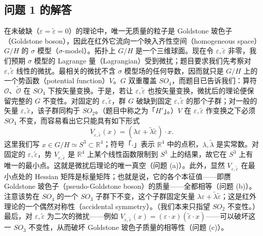 

\subsection*{问题 1 的解答}

在未破缺（$\varepsilon=\tilde\varepsilon=0$）的理论中，唯一无质量的粒子是 Goldstone 玻色子（Goldstone boson），因此在红外它流向一个映入齐性空间（homogeneous space）$G/H$ 的 $\sigma$ 模型（$\sigma$-model）。拓扑上 $G/H$ 是一个三维球面。现在令 $\varepsilon,\tilde\varepsilon$ 非零，我们预期 $\sigma$ 模型的 Lagrange 量（Lagrangian）受到微扰；题目要求我们先考察对 $\varepsilon,\tilde\varepsilon$ 线性的微扰。最相关的微扰不含 $\sigma$ 模型场的任何导数，因而就只是 $G/H$ 上的一个势函数（potential function）$V$。$G$ 双重覆盖 $SO_4$，而题目已告诉我们：算符 $\mathcal{O}$、$\tilde{\mathcal{O}}$ 在 $SO_4$ 下按矢量变换。于是，若让 $\varepsilon,\tilde\varepsilon$ 也按矢量变换，微扰后的理论便保留完整的 $G$ 不变性。对固定的 $\varepsilon,\tilde\varepsilon$，群 $G$ 破缺到固定 $\varepsilon,\tilde\varepsilon$ 的那个子群；对一般的矢量 $\varepsilon,\tilde\varepsilon$，该子群同构于 $SO_2$。（题目中称之为「$H'$」。）$V$ 在 $\varepsilon,\tilde\varepsilon$ 作变换之下必须 $SO_4$ 不变，而容易看出它只能具有如下形式
\[
V_{\varepsilon,\tilde\varepsilon}(x)=(\lambda\varepsilon+\tilde\lambda\tilde\varepsilon)\cdot x .
\]
这里我们写 $x\in G/H\simeq S^3\subset\mathbb{R}^4$；符号「$\cdot$」表示 $\mathbb{R}^4$ 中的点积，$\lambda,\tilde\lambda$ 是实常数。对固定的 $\varepsilon,\tilde\varepsilon$，势 $V_{\varepsilon,\tilde\varepsilon}$ 是 $\mathbb{R}^4$ 上某个线性函数限制到 $S^3$ 上的结果，故它在 $S^3$ 上有唯一的最小点。这就是微扰后理论的唯一真空（问题 (a)）。此外，显然 $V_{\varepsilon,\tilde\varepsilon}$ 在最小点处的 Hessian 矩阵是标量矩阵；也就是说，它的各个本征值——即赝 Goldstone 玻色子（pseudo-Goldstone boson）的质量——全都相等（问题 (b)）。注意该势在 $SO_4$ 的一个 $SO_3$ 子群下不变，这个子群固定矢量 $\lambda\varepsilon+\tilde\lambda\tilde\varepsilon$；这是红外理论的一个偶然对称性（accidental symmetry）。（我们本来只指望 $SO_2$ 不变性。）最后，对 $\varepsilon,\tilde\varepsilon$ 为二次的微扰——例如 $V_{\varepsilon,\tilde\varepsilon}(x)=(\varepsilon\cdot x)(\tilde\varepsilon\cdot x)$——可以破坏这一 $SO_3$ 不变性，从而破坏 Goldstone 玻色子质量的相等性（问题 (c)）。

